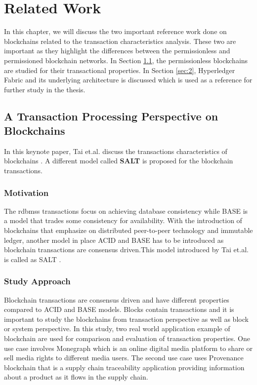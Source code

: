 \documentclass[
  a4paper,  %
  twoside,  %
  bibliography=totoc,
  headsepline,
  cleardoublepage=empty,
  parskip=half,
  draft=false
]{scrbook}
\begin{document}
\chapter{Related Work}
\label{chap:rel}
In this chapter, we will discuss the two important reference work done on blockchains related to the transaction characteristics analysis. These two are important as they highlight the differences between the permissionless and permissioned blockchain networks. In Section \ref{sec:1}, the permissionless blockchains are studied for their transactional properties. In Section \ref{sec:2}, Hyperledger Fabric and its underlying architecture is discussed which is used as a reference for further study in the thesis.

\section{A Transaction Processing Perspective on Blockchains}
\label{sec:1}
In this keynote paper, Tai et.al. discuss the transactions characteristics of blockchains \cite{Salt}. A different model called \textbf{SALT} is proposed for the blockchain transactions.

\subsection{Motivation}
The \glspl{rdbms} transactions focus on achieving database consistency while BASE is a model that trades some consistency for availability. With the introduction of blockchains that emphasize on distributed peer-to-peer technology and immutable ledger, another model in place ACID and BASE has to be introduced as blockchain transactions are consensus driven.This model introduced by Tai et.al. is called as SALT \cite{Salt}.

\subsection{Study Approach}
Blockchain transactions are consensus driven and have different properties compared to ACID and BASE models. Blocks contain transactions and it is important to study the blockchains from transaction perspective as well as block or system perspective. In this study, two real world application example of blockchain are used for comparison and evaluation of transaction properties. One use case involves Monegraph \cite{mon} which is an online digital media platform to share or sell media rights to different media users. The second use case uses Provenance blockchain \cite{pro} that is a supply chain traceability  application providing information about a product as it flows in the supply chain. 
\end{document}

